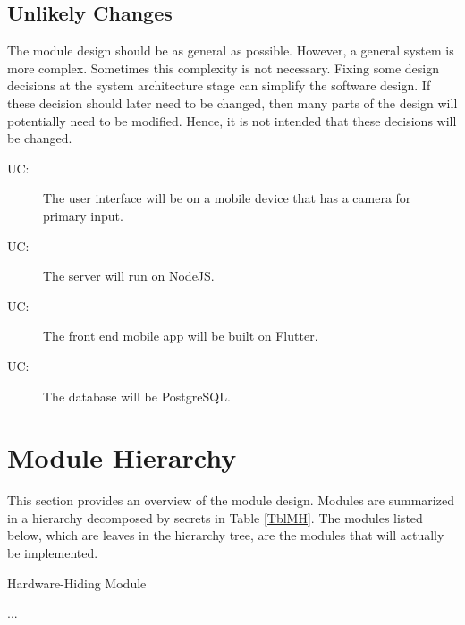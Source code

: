\documentclass[12pt, titlepage]{article}
\newcounter{ucnum}
\newcommand{\uctheucnum}{UC\theucnum}
\newcounter{mnum}
\newcommand{\mthemnum}{M\themnum}
\begin{document}
\subsection{Unlikely Changes} \label{SecUchange}

The module design should be as general as possible. However, a general system is
more complex. Sometimes this complexity is not necessary. Fixing some design
decisions at the system architecture stage can simplify the software design. If
these decision should later need to be changed, then many parts of the design
will potentially need to be modified. Hence, it is not intended that these
decisions will be changed.

\begin{description}
\item[ \uctheucnum \label{ucIO}:] The user interface will be on a mobile device that has a camera for primary input.
\item[ \uctheucnum \label{ucIO}:] The server will run on NodeJS.
\item[ \uctheucnum \label{ucIO}:] The front end mobile app will be built on Flutter.
\item[ \uctheucnum \label{ucIO}:] The database will be PostgreSQL.

\end{description}

\section{Module Hierarchy} \label{SecMH}

This section provides an overview of the module design. Modules are summarized
in a hierarchy decomposed by secrets in Table \ref{TblMH}. The modules listed
below, which are leaves in the hierarchy tree, are the modules that will
actually be implemented.

\begin{description}
\item [ \mthemnum \label{mHH}:] Hardware-Hiding Module
\item ...
\end{description}
\end{document}
